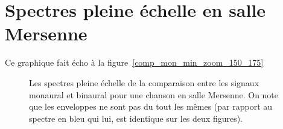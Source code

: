 \chapter{Spectres pleine échelle en salle Mersenne}

Ce graphique fait écho à la figure~\ref{comp_mon_min_zoom_150_175}

\begin{figure}[h!]
	\caption{Les spectres pleine échelle de la comparaison entre les signaux monaural et binaural pour une chanson en
salle Mersenne. On note que les enveloppes ne sont pas du tout les mêmes (par rapport au spectre en bleu qui lui,
est identique sur les deux figures).}
\end{figure}
